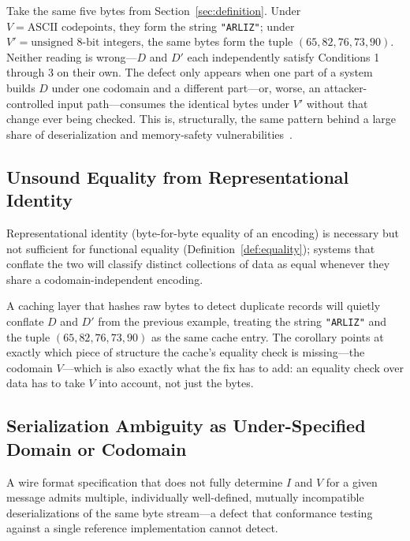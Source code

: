 \begin{example}
Take the same five bytes from Section~\ref{sec:definition}. Under
$V = \text{ASCII codepoints}$, they form the string \texttt{"ARLIZ"};
under $V' = \text{unsigned 8-bit integers}$, the same bytes form the
tuple $(65, 82, 76, 73, 90)$. Neither reading is wrong---$D$ and $D'$
each independently satisfy Conditions 1 through 3 on their own. The
defect only appears when one part of a system builds $D$ under one
codomain and a different part---or, worse, an attacker-controlled input
path---consumes the identical bytes under $V'$ without that change ever
being checked. This is, structurally, the same pattern behind a large
share of deserialization and memory-safety vulnerabilities~\autocite{cwe843}.
\end{example}

\subsection{Unsound Equality from Representational Identity}

\begin{corollary}
\label{cor:equality}
Representational identity (byte-for-byte equality of an encoding) is
necessary but not sufficient for functional equality
(Definition~\ref{def:equality}); systems that conflate the two will
classify distinct collections of data as equal whenever they share a
codomain-independent encoding.
\end{corollary}

\begin{example}
A caching layer that hashes raw bytes to detect duplicate records will
quietly conflate $D$ and $D'$ from the previous example, treating the
string \texttt{"ARLIZ"} and the tuple $(65, 82, 76, 73, 90)$ as the same
cache entry. The corollary points at exactly which piece of structure the
cache's equality check is missing---the codomain $V$---which is also
exactly what the fix has to add: an equality check over data has to take
$V$ into account, not just the bytes.
\end{example}

\subsection{Serialization Ambiguity as Under-Specified Domain or Codomain}

\begin{corollary}
\label{cor:serialization}
A wire format specification that does not fully determine $I$ and $V$ for a
given message admits multiple, individually well-defined, mutually
incompatible deserializations of the same byte stream---a defect that
conformance testing against a single reference implementation cannot detect.
\end{corollary}


